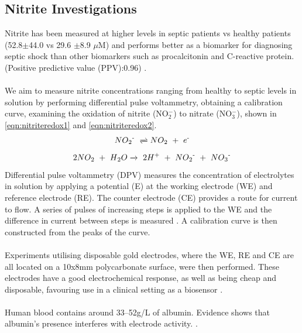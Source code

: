 \subsection{Nitrite Investigations}
Nitrite has been measured at higher levels in septic patients vs healthy patients (52.8$\pm$44.0 vs 29.6 $\pm$8.9 $\mu$M)\cite{pmid12688539} and performs better as a biomarker for diagnosing septic shock than other biomarkers such as procalcitonin and C-reactive protein. (Positive predictive value (PPV):0.96) \cite{pmid9142024}.\\\\
We aim to measure nitrite concentrations ranging from healthy to septic levels \cite{pmid12688539} in solution by performing differential pulse voltammetry, obtaining a calibration curve, examining the oxidation of nitrite (NO$_{2}^{-}$) to nitrate (NO$_{3}^{-}$), shown in \autoref{eqn:nitriteredox1} and \autoref{eqn:nitriteredox2}.
\begin{align} \label{eqn:nitriteredox1}
   NO\textsubscript{2}\textsuperscript{-} \ \xrightleftharpoons{}  NO\textsubscript{2} \ + \  e\textsuperscript{-}
\end{align} 
\begin{align}\label{eqn:nitriteredox2}
  2NO\textsubscript{2} \ + \ H\textsubscript{2}O \xrightarrow{}\  2H\textsuperscript{+} \ + \ NO\textsubscript{2}\textsuperscript{-} \ + \  NO\textsubscript{3}\textsuperscript{-}
\end{align}
Differential pulse voltammetry (DPV) measures the concentration of electrolytes in solution by applying a potential (E) at the working electrode (WE) and reference electrode (RE). The counter electrode (CE) provides a route for current to flow. A series of pulses of increasing steps is applied to the WE and the difference in current between steps is measured \cite{D1CP00661D}. A calibration curve is then constructed from the peaks of the curve. \\\\
Experiments utilising disposable gold electrodes, where the WE, RE and CE are all located on a 10x8mm polycarbonate surface, were then performed. These electrodes have a good electrochemical response, as well as being cheap and disposable, favouring use in a clinical setting as a biosensor \cite{FERRARIO201236}.\\\\
Human blood contains around 33–52g/L of albumin. Evidence shows that albumin's presence interferes with electrode activity. \cite{doi:10.1177/000456329102800111}.
